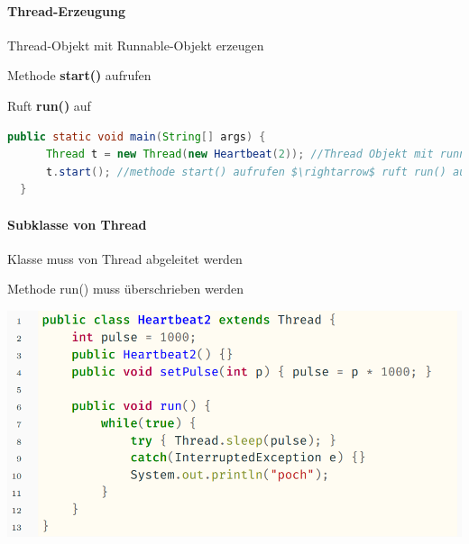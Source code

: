\documentclass[10pt]{article}
\begin{document}
\paragraph{Thread-Erzeugung}

\begin{itemize*}
  \item Thread-Objekt mit Runnable-Objekt erzeugen
  \item Methode \textbf{start()} aufrufen
  \begin{itemize*}
    \item Ruft \textbf{run()} auf
  \end{itemize*}
\end{itemize*}
\begin{lstlisting}[language=java]
  public static void main(String[] args) {
      Thread t = new Thread(new Heartbeat(2)); //Thread Objekt mit runnable erzeugen
      t.start(); //methode start() aufrufen $\rightarrow$ ruft run() auf
  }
  \end{lstlisting}

\paragraph{Subklasse von Thread}

\begin{itemize*}
  \item Klasse muss von Thread abgeleitet werden
  \item Methode run() muss überschrieben werden
\end{itemize*}
\begin{center}
  \includegraphics[width=0.4\linewidth]{Assets/Programmierparadigmen-code-snippet-49}
\end{center}
\end{document}
